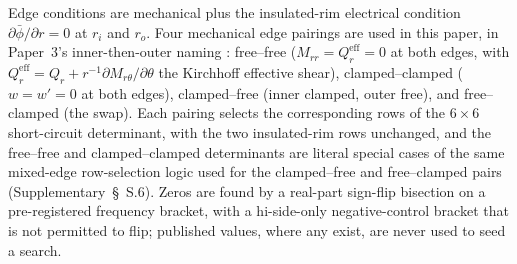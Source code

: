 \documentclass[11pt]{article}
\begin{document}
Edge conditions are mechanical plus the insulated-rim electrical
condition $\partial\bar\phi/\partial r=0$ at $r_i$ and $r_o$. Four
mechanical edge pairings are used in this paper, in Paper~3's
inner-then-outer naming \cite{mccune2026ring}: free--free
($M_{rr}=Q_r^{\mathrm{eff}}=0$ at both edges, with
$Q_r^{\mathrm{eff}}=Q_r+r^{-1}\partial M_{r\theta}/\partial\theta$ the Kirchhoff
effective shear), clamped--clamped ($w=w'=0$ at both
edges), clamped--free (inner clamped, outer free), and free--clamped (the
swap). Each pairing selects the corresponding rows of the $6\times6$
short-circuit determinant, with the two insulated-rim rows unchanged, and
the free--free and clamped--clamped determinants are literal special
cases of the same mixed-edge row-selection logic used for the
clamped--free and free--clamped pairs (Supplementary~\S~S.6). Zeros are
found by a real-part sign-flip bisection on a pre-registered frequency
bracket, with a hi-side-only negative-control bracket that is not
permitted to flip; published values, where any exist, are never used to
seed a search.
\end{document}
